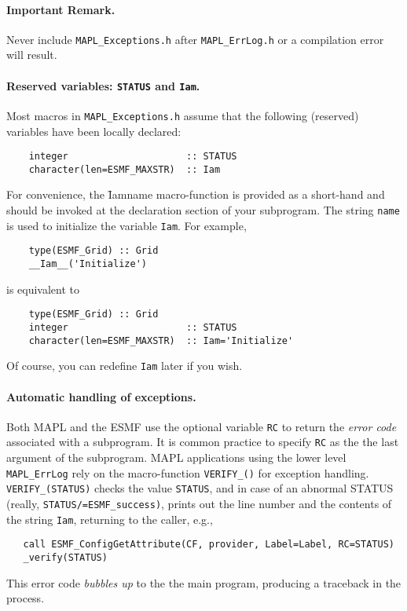\paragraph{Important Remark.} Never include {\tt MAPL\_Exceptions.h}
after {\tt MAPL\_ErrLog.h} or a compilation error will result. 

\paragraph{Reserved variables: {\tt STATUS} and {\tt Iam}.} Most
macros in {\tt MAPL\_Exceptions.h} assume that the following
(reserved) variables have been locally declared:
\begin{verbatim}
    integer                     :: STATUS
    character(len=ESMF_MAXSTR)  :: Iam
\end{verbatim}
For convenience, the \f{Iam}{name} macro-function is provided as a
short-hand and should be invoked at the declaration section of your
subprogram. The string {\tt name} is used to initialize the variable
{\tt Iam}. For example,
\begin{verbatim}
    type(ESMF_Grid) :: Grid
    __Iam__('Initialize')
\end{verbatim}
is equivalent to
\begin{verbatim}
    type(ESMF_Grid) :: Grid
    integer                     :: STATUS
    character(len=ESMF_MAXSTR)  :: Iam='Initialize'
\end{verbatim}
Of course, you can redefine {\tt Iam} later if you wish.

\paragraph{Automatic handling of exceptions.}

Both MAPL and the ESMF use the optional variable {\tt RC} to return
the {\em error code} associated with a subprogram. It is common
practice to specify {\tt RC} as the the last argument of the subprogram. MAPL
applications using the lower level {\tt MAPL\_ErrLog} rely on the
macro-function {\tt VERIFY\_()} for exception handling. {\tt
  VERIFY\_(STATUS)} checks the value {\tt STATUS}, and in case of an
abnormal STATUS (really, {\tt STATUS/=ESMF\_success)}, prints out the line
number and the contents of the string {\tt Iam}, returning to the caller, e.g.,
\begin{verbatim}
   call ESMF_ConfigGetAttribute(CF, provider, Label=Label, RC=STATUS)
   _verify(STATUS)
\end{verbatim}
This error code {\em bubbles up} to the the main program, producing a
traceback in the process.

